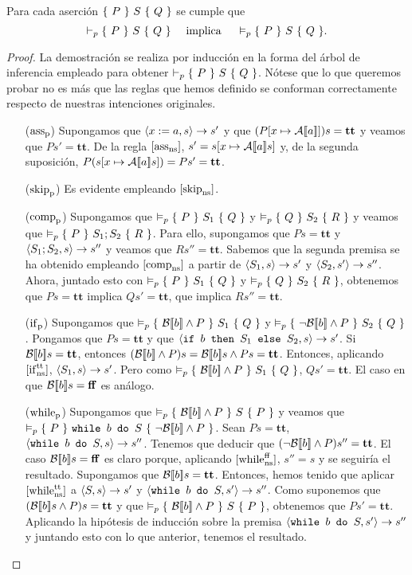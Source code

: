 \begin{theorem}[De corrección]
Para cada aserción $\{\, \, P \, \, \}\, \, S\, \, \{ \, \, Q \, \, \}$ se cumple que 
$$\vdash_p \{\, \, P \, \, \}\, \, S\, \, \{ \, \, Q \, \, \}\quad \text{ implica }\quad\vDash_p \{\, \, P \, \, \}\, \, S\, \, \{ \, \, Q \, \, \}.$$
\end{theorem}
\begin{proof}
La demostración se realiza por inducción en la forma del árbol de inferencia empleado para obtener $\vdash_p \{\, \, P \, \, \}\, \, S\, \, \{ \, \, Q \, \, \}$. Nótese que lo que queremos probar no es más que las reglas que hemos definido se conforman correctamente respecto de nuestras intenciones originales.
\begin{itemize}
    \item[($\mathrm{ass}_{\mathrm{p}}$)] Supongamos que $\langle x:=a, s \rangle\to s'$ y que $(P[x\mapsto \mathcal{A}[\![a]\!]])s = \mathbf{tt}$ y veamos que $Ps' = \mathbf{tt}$. De la regla $[\mathrm{ass}_{\mathrm{ns}}]$, $s' = s[x\mapsto \mathcal{A}[\![a]\!]s]$ y, de la segunda suposición, $P(s[x \mapsto \mathcal{A}[\![a]\!]s]) = Ps' = \mathbf{tt}$.
    \item[($\mathrm{skip}_{\mathrm{p}}$)] Es evidente empleando $[\mathrm{skip}_{\mathrm{ns}}]$.
    \item[($\mathrm{comp}_{\mathrm{p}}$)] Supongamos que $\vDash_p \{\, \, P \, \, \}\, \, S_1\, \, \{ \, \, Q \, \, \}$ y $\vDash_p \{\, \, Q \, \, \}\, \, S_2\, \, \{ \, \, R \, \, \}$ y veamos que $\vDash_p \{\, \, P \, \, \}\, \, S_1;S_2\, \, \{ \, \, R \, \, \}$. Para ello, supongamos que $Ps= \mathbf{tt}$ y $\langle S_1;S_2, s \rangle\to s''$ y veamos que $Rs''= \mathbf{tt}$. Sabemos que la segunda premisa se ha obtenido empleando $[\mathrm{comp}_{\mathrm{ns}}]$ a partir de $\langle S_1, s \rangle\to s'$ y $\langle S_2, s' \rangle\to s''$. Ahora, juntado esto con $\vDash_p \{\, \, P \, \, \}\, \, S_1\, \, \{ \, \, Q \, \, \}$ y $\vDash_p \{\, \, Q \, \, \}\, \, S_2\, \, \{ \, \, R \, \, \}$, obtenemos que $Ps = \mathbf{tt}$ implica $Qs' = \mathbf{tt}$, que implica $Rs'' = \mathbf{tt}$.
    \item[($\mathrm{if}_{\mathrm{p}}$)] Supongamos que $\vDash_p \{\, \, \mathcal{B}[\![b]\!]\land P \, \, \}\, \, S_1\, \, \{ \, \, Q \, \, \}$ y $\vDash_p \{\, \, \neg\mathcal{B}[\![b]\!]\land P \, \, \}\, \, S_2\, \, \{ \, \, Q \, \, \}$. Pongamos que $Ps = \mathbf{tt}$ y que $\langle \texttt{if }b\texttt{ then }S_1\texttt{ else }S_2, s \rangle\to s'$. Si $\mathcal{B}[\![b]\!]s = \mathbf{tt}$, entonces $(\mathcal{B}[\![b]\!]\land P)s = \mathcal{B}[\![b]\!]s \land Ps = \mathbf{tt}$. Entonces, aplicando $[\mathrm{if}_{\mathrm{ns}}^{\mathrm{tt}}]$, $\langle S_1, s \rangle\to s'$. Pero como $\vDash_p \{\, \, \mathcal{B}[\![b]\!]\land P \, \, \}\, \, S_1\, \, \{ \, \, Q \, \, \}$, $Qs' = \mathbf{tt}$. El caso en que $\mathcal{B}[\![b]\!]s = \mathbf{ff}$ es análogo.
    \item[($\mathrm{while}_{\mathrm{p}}$)] Supongamos que $\vDash_p \{\, \, \mathcal{B}[\![b]\!]\land P \, \, \}\, \, S\, \, \{ \, \, P \, \, \}$ y veamos que $\vDash_p \{\, \, P \, \, \}\, \, \texttt{while }b\texttt{ do }S\, \, \{ \, \, \neg\mathcal{B}[\![b]\!]\land P \, \, \}$. Sean $Ps = \mathbf{tt}$, $\langle \texttt{while }b\texttt{ do }S, s \rangle\to s''$. Tenemos que deducir que $(\neg\mathcal{B}[\![b]\!]\land P)s'' = \mathbf{tt}$. El caso $\mathcal{B}[\![b]\!]s = \mathbf{ff}$ es claro porque, aplicando $[\mathrm{while}_{\mathrm{ns}}^{\mathrm{ff}}]$, $s'' = s$ y se seguiría el resultado. Supongamos que $\mathcal{B}[\![b]\!]s = \mathbf{tt}$. Entonces, hemos tenido que aplicar $[\mathrm{while}_{\mathrm{ns}}^{\mathrm{tt}}]$ a $\langle S, s \rangle\to s'$ y $\langle \texttt{while }b\texttt{ do }S, s' \rangle\to s''$. Como suponemos que $(\mathcal{B}[\![b]\!]s \land P)s = \mathbf{tt}$ y que $\vDash_p \{\, \, \mathcal{B}[\![b]\!]\land P \, \, \}\, \, S\, \, \{ \, \, P \, \, \}$, obtenemos que $Ps' = \mathbf{tt}$. Aplicando la hipótesis de inducción sobre la premisa $\langle \texttt{while }b\texttt{ do }S, s' \rangle\to s''$ y juntando esto con lo que anterior, tenemos el resultado.

\end{itemize}
\end{proof}
